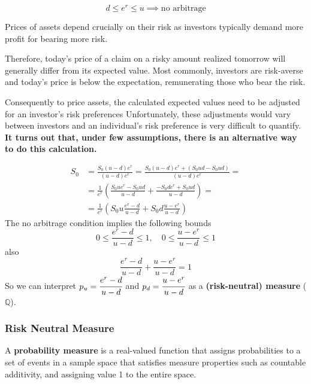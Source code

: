\documentclass[12pt,a4paper]{book}
\begin{document}
\begin{equation*}
\boxed{d\le e^r \le u \implies \text{no arbitrage}}
\end{equation*}

Prices of assets depend crucially on their risk as investors typically demand more profit for bearing more risk.

Therefore, today's price of a claim on a risky amount realized tomorrow will generally differ from its expected value.
Most commonly, investors are risk-averse and today's price is below the expectation, remunerating those who bear the risk.

Consequently to price assets, the calculated expected values need to be adjusted for an investor's risk preferences
Unfortunately, these adjustments would vary between investors and an individual's risk preference is very difficult to quantify.
\textbf{It turns out that, under few assumptions, there is an alternative way to do this calculation.}

\begin{equation*}
\begin{aligned}
S_0 &= \frac{S_0(u-d)e^r}{(u-d)e^r} = \frac{S_0(u-d)e^r + (S_0ud - S_0ud)}{(u-d)e^r}=\\
&= \frac{1}{e^r}\left(\frac{S_0ue^r - S_0ud}{u-d} + \frac{-S_0de^r + S_0ud}{u-d}\right)=\\
&= \frac{1}{e^r}\left(S_0u\frac{e^r - d}{u-d} + S_0d\frac{u - e^r}{u-d}\right)
\end{aligned}
\end{equation*}
The no arbitrage condition implies the following bounds
\begin{equation*}
\boxed{0\le\frac{e^r -d}{u-d}\le 1,\quad 0\le\frac{u - e^r}{u-d}\le 1}
\end{equation*}
also
\begin{equation}
\boxed{\frac{e^r -d}{u-d} + \frac{u - e^r}{u-d} = 1}
\label{eq:risk_neutral_probabilities}
\end{equation}
So we can interpret $p_u=\cfrac{e^r -d}{u-d}$ and $p_d=\cfrac{u - e^r}{u-d}$ as a \textbf{(risk-neutral) measure} ($\mathbb{Q}$).\vspace{0.3cm}
		
\subsubsection{Risk Neutral Measure}
A \textbf{probability measure} is a real-valued function that assigns probabilities to a set of events in a sample space that satisfies measure properties such as countable additivity, and assigning value 1 to the entire space.
\end{document}
